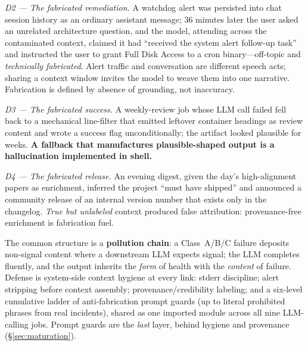 \documentclass[conference]{IEEEtran}
\begin{document}
\emph{D2 --- The fabricated remediation.} A watchdog alert was persisted
into chat session history as an ordinary assistant message; 36 minutes
later the user asked an unrelated architecture question, and the model,
attending across the contaminated context, claimed it had ``received the
system alert follow-up task'' and instructed the user to grant Full Disk
Access to a cron binary---off-topic and \emph{technically fabricated}.
Alert traffic and conversation are different speech acts; sharing a
context window invites the model to weave them into one narrative.
Fabrication is defined by absence of grounding, not inaccuracy.

\emph{D3 --- The fabricated success.} A weekly-review job whose LLM call
failed fell back to a mechanical line-filter that emitted leftover
container headings as review content and wrote a success flag
unconditionally; the artifact looked plausible for weeks. \textbf{A
fallback that manufactures plausible-shaped output is a hallucination
implemented in shell.}

\emph{D4 --- The fabricated release.} An evening digest, given the day's
high-alignment papers as enrichment, inferred the project ``must have
shipped'' and announced a community release of an internal version number
that exists only in the changelog. \emph{True but unlabeled} context
produced false attribution: provenance-free enrichment is fabrication
fuel.

The common structure is a \textbf{pollution chain}: a Class~A/B/C failure
deposits non-signal content where a downstream LLM expects signal; the LLM
completes fluently, and the output inherits the \emph{form} of health with
the \emph{content} of failure. Defense is system-side context hygiene at
every link: stderr discipline; alert stripping before context assembly;
provenance/credibility labeling; and a six-level cumulative ladder of
anti-fabrication prompt guards (up to literal prohibited phrases from real
incidents), shared as one imported module across all nine LLM-calling
jobs. Prompt guards are the \emph{last} layer, behind hygiene and
provenance (\S\ref{sec:maturation}).
\end{document}
